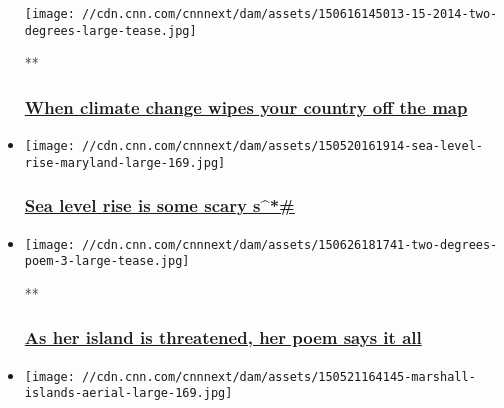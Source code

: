 \begin{itemize}
  \texttt{[image: //cdn.cnn.com/cnnnext/dam/assets/150616145013-15-2014-two-degrees-large-tease.jpg]}

  **

  \hypertarget{when-climate-change-wipes-your-country-off-the-map}{%
  \subsubsection{\texorpdfstring{\href{/videos/us/2015/06/24/orig-sutter-climate-change-marshall-islands-sinking-two-degrees.cnn}{When
  climate change wipes your country off the
  map}}{When climate change wipes your country off the map}}\label{when-climate-change-wipes-your-country-off-the-map}}
\item
  \href{/2015/06/10/opinions/sutter-climate-sea-level-facts/index.html}{}

  \texttt{[image: //cdn.cnn.com/cnnnext/dam/assets/150520161914-sea-level-rise-maryland-large-169.jpg]}

  \hypertarget{sea-level-rise-is-some-scary-s}{%
  \subsubsection{\texorpdfstring{\href{/2015/06/10/opinions/sutter-climate-sea-level-facts/index.html}{Sea
  level rise is some scary
  s\^{}*\#}}{Sea level rise is some scary s\^{}*\#}}\label{sea-level-rise-is-some-scary-s}}
\item
  \href{/videos/world/2015/06/26/orig-sutter-climate-change-two-degrees-poem.cnn}{}

  \texttt{[image: //cdn.cnn.com/cnnnext/dam/assets/150626181741-two-degrees-poem-3-large-tease.jpg]}

  **

  \hypertarget{as-her-island-is-threatened-her-poem-says-it-all}{%
  \subsubsection{\texorpdfstring{\href{/videos/world/2015/06/26/orig-sutter-climate-change-two-degrees-poem.cnn}{As
  her island is threatened, her poem says it
  all}}{As her island is threatened, her poem says it all}}\label{as-her-island-is-threatened-her-poem-says-it-all}}
\item
  \href{/2015/05/25/opinions/sutter-snapchat-climate-marshall-islands/index.html}{}

  \texttt{[image: //cdn.cnn.com/cnnnext/dam/assets/150521164145-marshall-islands-aerial-large-169.jpg]}


\end{itemize}
